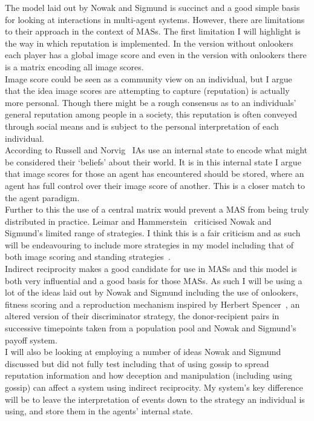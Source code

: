 \documentclass[]{final_report}
\begin{document}
The model laid out by Nowak and Sigmund is succinct and a good simple basis for looking at interactions in multi-agent systems. However, there are limitations to their approach in the context of MASs. The first limitation I will highlight is the way in which reputation is implemented. In the version without onlookers each player has a global image score and even in the version with onlookers there is a matrix encoding all image scores.\\
Image score could be seen as a community view on an individual, but I argue that the idea image scores are attempting to capture (reputation) is actually more personal. Though there might be a rough consensus as to an individuals' general reputation among people in a society, this reputation is often conveyed through social means and is subject to the personal interpretation of each individual.\\
According to Russell and Norvig~\cite{russell2016artificial} IAs use an internal state to encode what might be considered their `beliefs' about their world. It is in this internal state I argue that image scores for those an agent has encountered should be stored, where an agent has full control over their image score of another. This is a closer match to the agent paradigm.\\
Further to this the use of a central matrix would prevent a MAS from being truly distributed in practice. Leimar and Hammerstein~\cite{leimarhammer} criticised Nowak and Sigmund's limited range of strategies. I think this is a fair criticism and as such will be endeavouring to include more strategies in my model including that of both image scoring and standing strategies~\cite{sugden2004economics}.\\
Indirect reciprocity makes a good candidate for use in MASs and this model is both very influential and a good basis for those MASs. As such I will be using a lot of the ideas laid out by Nowak and Sigmund including the use of onlookers, fitness scoring and a reproduction mechanism inspired by Herbert Spencer~\cite{spencer1864principles}, an altered version of their discriminator strategy, the donor-recipient pairs in successive timepoints taken from a population pool and Nowak and Sigmund's payoff system.\\
I will also be looking at employing a number of ideas Nowak and Sigmund discussed but did not fully test including that of using gossip to spread reputation information and how deception and manipulation (including using gossip) can affect a system using indirect reciprocity. My system's key difference will be to leave the interpretation of events down to the strategy an individual is using, and store them in the agents' internal state.
\end{document}
